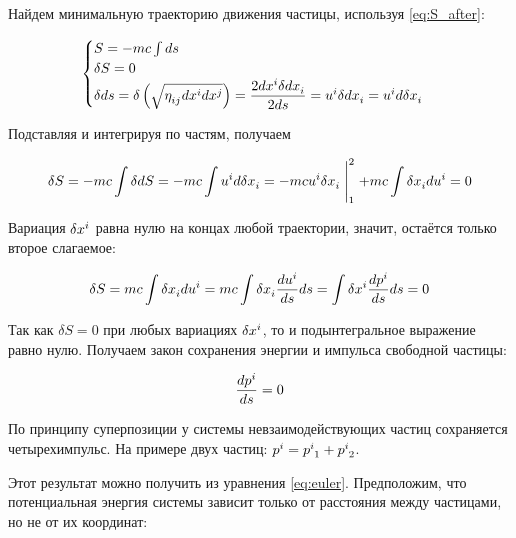 \documentclass{article}
\begin{document}
Найдем минимальную траекторию движения частицы, используя \eqref{eq:S_after}:

\begin{equation*}
    \begin{cases}
    S=-mc\int ds\\
    \delta S=0\\
    \delta ds=\delta\left(\sqrt{\tensor{\eta}{_i_j}d\tensor{x}{^i}d\tensor{x}{^j}}\right)=\dfrac{2d\tensor{x}{^i}\delta d\tensor{x}{_i}}{2ds}=\tensor{u}{^i}\delta d\tensor{x}{_i}=\tensor{u}{^i}d\delta\tensor{x}{_i}
    \end{cases}
\end{equation*}

Подставляя и интегрируя по частям, получаем

\begin{equation*}
    \delta S=-mc\int\delta dS=-mc\int\tensor{u}{^i}d\delta\tensor{x}{_i}=-mc\tensor{u}{^i}\delta\tensor{x}{_i}\Biggm\vert_1^2+mc\int\delta\tensor{x}{_i}d\tensor{u}{^i}=0
\end{equation*}

Вариация $\delta\tensor{x}{^i}$ равна нулю на концах любой траектории, значит, остаётся только второе слагаемое:

\begin{equation*}
    \delta S=mc\int\delta\tensor{x}{_i}d\tensor{u}{^i}=mc\int\delta\tensor{x}{_i}\dfrac{d\tensor{u}{^i}}{ds}ds=\int\delta\tensor{x}{^i}\dfrac{d\tensor{p}{^i}}{ds}ds=0
\end{equation*}

Так как $\delta S=0$ при любых вариациях  $\delta\tensor{x}{^i}$, то и подынтегральное выражение равно нулю. Получаем закон сохранения энергии и импульса свободной частицы:

\begin{equation}
    \dfrac{d\tensor{p}{^i}}{ds}=0
\end{equation}

По принципу суперпозиции у системы невзаимодействующих частиц сохраняется четырехимпульс. На примере двух частиц: $\tensor{p}{^i}=\tensor{p}{^i_1}+\tensor{p}{^i_2}$.

Этот результат можно получить из уравнения \eqref{eq:euler}. Предположим, что потенциальная энергия системы зависит только от расстояния между частицами, но не от их координат:
\end{document}

